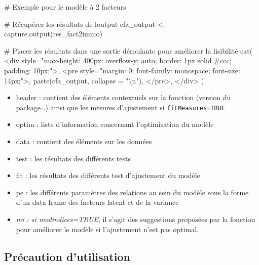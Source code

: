 \documentclass[
  french,
  11pt,
  a4paper,
]{article}
\newenvironment{Shaded}{}{}
\newcommand{\AttributeTok}[1]{\textcolor[rgb]{0.84,0.23,0.29}{#1}}
\newcommand{\CommentTok}[1]{\textcolor[rgb]{0.42,0.45,0.49}{#1}}
\newcommand{\FunctionTok}[1]{\textcolor[rgb]{0.44,0.26,0.76}{#1}}
\newcommand{\NormalTok}[1]{\textcolor[rgb]{0.14,0.16,0.18}{#1}}
\newcommand{\OtherTok}[1]{\textcolor[rgb]{0.44,0.26,0.76}{#1}}
\newcommand{\SpecialCharTok}[1]{\textcolor[rgb]{0.00,0.36,0.77}{#1}}
\newcommand{\StringTok}[1]{\textcolor[rgb]{0.01,0.18,0.38}{#1}}
\providecommand{\tightlist}{%
  \setlength{\itemsep}{0pt}\setlength{\parskip}{0pt}}
\begin{document}
\begin{Shaded}
\begin{Highlighting}[]
\CommentTok{\# Exemple pour le modèle à 2 facteurs}

\CommentTok{\# Récupérer les résultats de l\textquotesingle{}output}
\NormalTok{cfa\_output }\OtherTok{\textless{}{-}} \FunctionTok{capture.output}\NormalTok{(res\_fact2immo)}

\CommentTok{\# Placer les résultats dans une sortie déroulante pour améliorer la lisibilité}
\FunctionTok{cat}\NormalTok{(}
  \StringTok{\textquotesingle{}\textless{}div style="max{-}height: 400px; overflow{-}y: auto; border: 1px solid \#ccc; padding: 10px;"\textgreater{}\textquotesingle{}}\NormalTok{,}
  \StringTok{\textquotesingle{}\textless{}pre style="margin: 0; font{-}family: monospace; font{-}size: 14px;"\textgreater{}\textquotesingle{}}\NormalTok{,}
  \FunctionTok{paste}\NormalTok{(cfa\_output, }\AttributeTok{collapse =} \StringTok{"}\SpecialCharTok{\textbackslash{}n}\StringTok{"}\NormalTok{),}
  \StringTok{\textquotesingle{}\textless{}/pre\textgreater{}\textquotesingle{}}\NormalTok{,}
  \StringTok{\textquotesingle{}\textless{}/div\textgreater{}\textquotesingle{}}
\NormalTok{)}
\end{Highlighting}
\end{Shaded}

\begin{itemize}
\tightlist
\item
  header : contient des éléments contextuels sur la fonction (version du
  package\ldots) ainsi que les mesures d'ajustement si
  \texttt{fitMeasures=TRUE}
\item
  optim : liste d'information concernant l'optimisation du modèle
\item
  data : contient des éléments sur les données
\item
  test : les résultats des différents tests
\item
  fit : les résultats des différents test d'ajustement du modèle
\item
  pe : les différents paramètres des relations au sein du modèle sous la
  forme d'un data frame des facteurs latent et de la variance
\item
  \emph{mi : si modindices=TRUE}, il s'agit des suggestions proposées
  par la fonction pour améliorer le modèle si l'ajustement n'est pas
  optimal.
\end{itemize}

\subsection{Précaution d'utilisation}\label{pruxe9caution-dutilisation}
\end{document}
